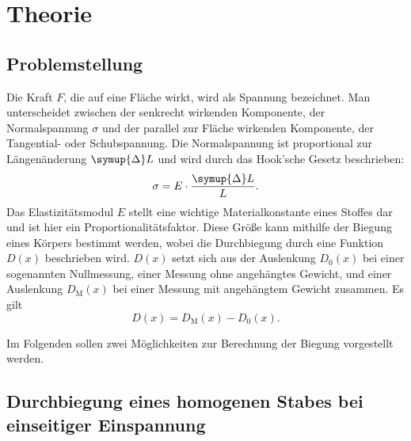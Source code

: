 \section{Theorie} \label{sec:theorie}

\subsection{Problemstellung} \label{sec:problem}

    Die Kraft $F$, die auf eine Fläche wirkt, wird als Spannung bezeichnet.
    Man unterscheidet zwischen der senkrecht wirkenden Komponente, der Normalspannung $\sigma$
    und der parallel zur Fläche wirkenden Komponente, der Tangential- oder Schubspannung.
    Die Normalspannung ist proportional zur Längenänderung $\symup{\Delta}L$ und wird
    durch das Hook'sche Gesetz beschrieben:
    \begin{equation}
        \sigma = E \cdot \frac{\symup{\Delta}L}{L} .
    \end{equation}
    Das Elastizitätsmodul $E$ stellt eine wichtige Materialkonstante eines Stoffes dar und 
    ist hier ein Proportionalitätsfaktor.
    Diese Größe kann mithilfe der Biegung eines Körpers bestimmt werden, 
    wobei die Durchbiegung durch eine Funktion $D(x)$ beschrieben wird.
    $D(x)$ setzt sich aus der Auslenkung $D_0(x)$ bei einer sogenannten Nullmessung, 
    einer Messung ohne angehängtes Gewicht, und einer Auslenkung $D_\text{M}(x)$  bei einer
    Messung mit angehängtem Gewicht zusammen.
    Es gilt
    \begin{equation}
        D(x) = D_\text{M}(x) - D_0(x) .
    \end{equation}

    Im Folgenden sollen zwei Möglichkeiten zur Berechnung der Biegung vorgestellt werden.

\subsection{Durchbiegung eines homogenen Stabes bei einseitiger Einspannung} \label{sec:einseitig}

